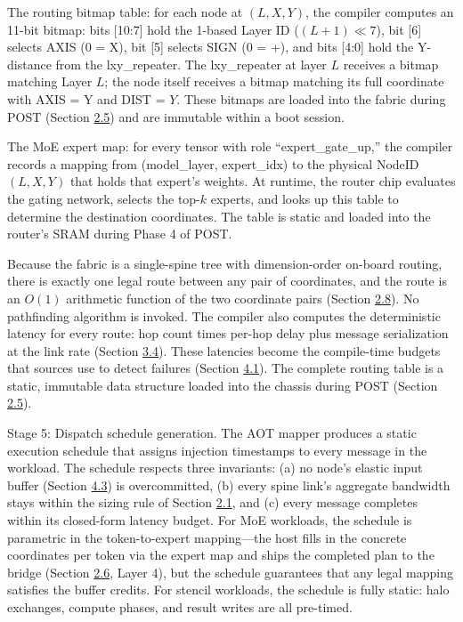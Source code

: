 \documentclass[10pt,twocolumn]{article}
\begin{document}
The routing bitmap table: for each node at $(L, X, Y)$, the compiler computes an 11-bit bitmap: bits [10:7] hold the 1-based Layer ID ($(L+1) \ll 7$), bit [6] selects AXIS (0 = X), bit [5] selects SIGN (0 = +), and bits [4:0] hold the Y-distance from the lxy\_repeater. The lxy\_repeater at layer $L$ receives a bitmap matching Layer $L$; the node itself receives a bitmap matching its full coordinate with AXIS = Y and DIST = $Y$. These bitmaps are loaded into the fabric during POST (Section \hyperref[sec:2.5]{2.5}) and are immutable within a boot session.

The MoE expert map: for every tensor with role ``expert\_gate\_up,'' the compiler records a mapping from (model\_layer, expert\_idx) to the physical NodeID $(L, X, Y)$ that holds that expert's weights. At runtime, the router chip evaluates the gating network, selects the top-$k$ experts, and looks up this table to determine the destination coordinates. The table is static and loaded into the router's SRAM during Phase 4 of POST.

Because the fabric is a single-spine tree with dimension-order on-board routing, there is exactly one legal route between any pair of coordinates, and the route is an $O(1)$ arithmetic function of the two coordinate pairs (Section \hyperref[sec:2.8]{2.8}). No pathfinding algorithm is invoked. The compiler also computes the deterministic latency for every route: hop count times per-hop delay plus message serialization at the link rate (Section \hyperref[sec:3.4]{3.4}). These latencies become the compile-time budgets that sources use to detect failures (Section \hyperref[sec:4.1]{4.1}). The complete routing table is a static, immutable data structure loaded into the chassis during POST (Section \hyperref[sec:2.5]{2.5}).

Stage 5: Dispatch schedule generation. The AOT mapper produces a static execution schedule that assigns injection timestamps to every message in the workload. The schedule respects three invariants: (a) no node's elastic input buffer (Section \hyperref[sec:4.3]{4.3}) is overcommitted, (b) every spine link's aggregate bandwidth stays within the sizing rule of Section \hyperref[sec:2.1]{2.1}, and (c) every message completes within its closed-form latency budget. For MoE workloads, the schedule is parametric in the token-to-expert mapping---the host fills in the concrete coordinates per token via the expert map and ships the completed plan to the bridge (Section \hyperref[sec:2.6]{2.6}, Layer 4), but the schedule guarantees that any legal mapping satisfies the buffer credits. For stencil workloads, the schedule is fully static: halo exchanges, compute phases, and result writes are all pre-timed.
\end{document}
